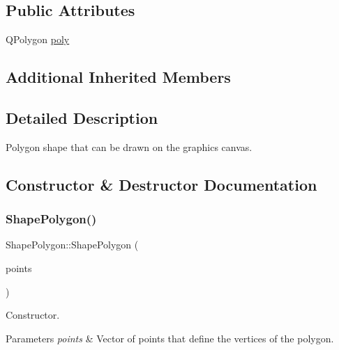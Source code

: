 \subsection*{Public Attributes}
\begin{DoxyCompactItemize}
\item 
Q\+Polygon \mbox{\hyperlink{class_shape_polygon_a28be8d33f69f3e0e895acd9d574a814f}{poly}}
\end{DoxyCompactItemize}
\subsection*{Additional Inherited Members}


\subsection{Detailed Description}
Polygon shape that can be drawn on the graphics canvas. 



\subsection{Constructor \& Destructor Documentation}
\mbox{\label{class_shape_polygon_a61a8bdd77cdf95139b6ee728a9000e45}} 
\subsubsection{\texorpdfstring{ShapePolygon()}{ShapePolygon()}\hspace{0.1cm}{\footnotesize\ttfamily [1/2]}}
{\footnotesize\ttfamily Shape\+Polygon\+::\+Shape\+Polygon (\begin{DoxyParamCaption}\item[{const Q\+Vector$<$ Q\+Point $>$ \&}]{points }\end{DoxyParamCaption})}



Constructor. 


\begin{DoxyParams}{Parameters}
{\em points} & Vector of points that define the vertices of the polygon. \\
\hline
\end{DoxyParams}
\mbox{\label{class_shape_polygon_a51d433edd43f608acce1fae81e5583d5}} 
